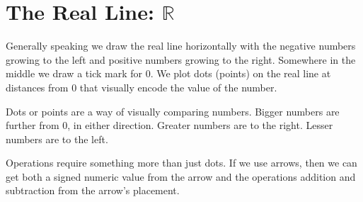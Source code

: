 \documentclass{ximera}
\begin{document}
\section*{The Real Line:  $\mathbb{R}$}





Generally speaking we draw the real line horizontally with the negative numbers growing to the left and positive numbers growing to the right. Somewhere in the middle we draw a tick mark for $0$. We plot dots (points) on the real line at distances from $0$ that visually encode the value of the number.












  \begin{image}
  \end{image}


Dots or points are a way of visually comparing numbers.  Bigger numbers are further from $0$, in either direction.  Greater numbers are to the right.  Lesser numbers are to the left.




Operations require something more than just dots. If we use arrows, then we can get both a signed numeric value from the arrow and the operations addition and subtraction from the arrow's placement.
\end{document}
